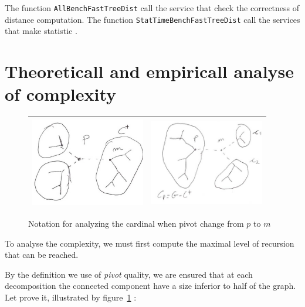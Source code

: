 \documentclass[a4paper]{article}
\begin{document}
The function {\tt AllBenchFastTreeDist} call the service that check the correctness of distance computation.
The function {\tt StatTimeBenchFastTreeDist} call the services that make statistic .

    




\section{Theoreticall and empiricall analyse of complexity}

\begin{figure}
\centering
\begin{tabular}{||c|c||}
 \hline \hline
\includegraphics[width=5cm]{FIGS/FTD-Pivp.jpg} &
\includegraphics[width=5cm]{FIGS/FTD-Pivm.jpg} 
 \\ \hline \hline
\end{tabular}
\caption{Notation for analyzing the cardinal when pivot change from $p$ to $m$}
\label{TreeComplexity}
\end{figure}


To analyse the complexity, we must first compute the maximal level of
recursion that can be reached.

By the definition we use of \emph{pivot} quality, we are ensured
that at each decomposition the connected component have a size inferior to
half of the graph. Let prove it, illustrated by figure~\ref{TreeComplexity} :
\end{document}

